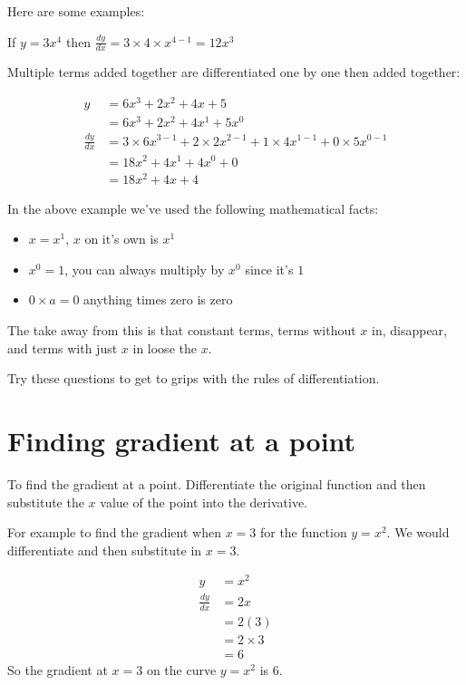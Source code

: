 \documentclass[
  a4paper,
]{scrbook}
\providecommand{\tightlist}{%
  \setlength{\itemsep}{0pt}\setlength{\parskip}{0pt}}
\begin{document}
Here are some examples:

If \(y = 3x^4\) then
\(\frac{dy}{dx} = 3 \times 4 \times x^{4-1} = 12x^3\)

Multiple terms added together are differentiated one by one then added
together:

\[
\begin{aligned} y &= 6x^3 + 2x^2 + 4x + 5 \\
 &= 6x^3 + 2x^2 + 4x^1 + 5x^0 \\
\frac{dy}{dx} &= 3\times6x^{3-1} + 2\times 2x^{2-1} + 1\times 4x^{1-1} + 0\times5x^{0-1} \\
&= 18x^2 + 4x^1 + 4x^{0} + 0 \\
&= 18x^2 + 4x + 4
\end{aligned}
\]

In the above example we've used the following mathematical facts:

\begin{itemize}
\tightlist
\item
  \(x=x^1\), \(x\) on it's own is \(x^1\)
\item
  \(x^0=1\), you can always multiply by \(x^0\) since it's \(1\)
\item
  \(0 \times a = 0\) anything times zero is zero
\end{itemize}

The take away from this is that constant terms, terms without \(x\) in,
disappear, and terms with just \(x\) in loose the \(x\).

Try these questions to get to grips with the rules of differentiation.

\section{Finding gradient at a point}\label{finding-gradient-at-a-point}

To find the gradient at a point. Differentiate the original function and
then substitute the \(x\) value of the point into the derivative.

For example to find the gradient when \(x=3\) for the function
\(y=x^2\). We would differentiate and then substitute in \(x=3\).

\[
\begin{aligned} y &= x^2 \\
\frac{dy}{dx} &= 2x \\
&= 2(3) \\
&= 2 \times 3 \\
&= 6
\end{aligned}
\] So the gradient at \(x=3\) on the curve \(y=x^2\) is \(6\).
\end{document}
